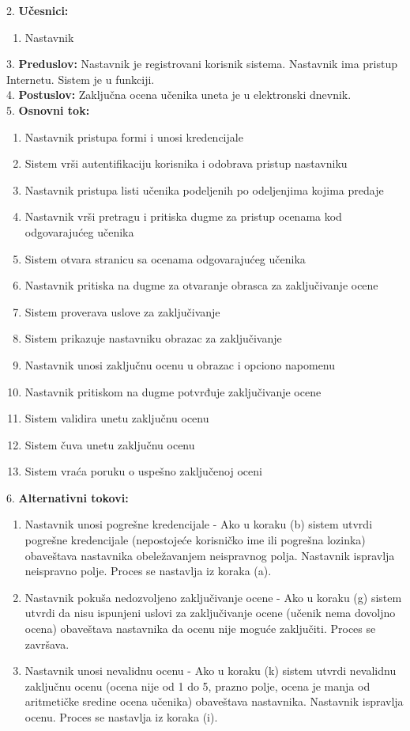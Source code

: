 \documentclass{article}
\begin{document}
2. \textbf{Učesnici:}
\begin{enumerate} [label=(\alph*)]
\item Nastavnik
\end{enumerate} 

3. \textbf{Preduslov:} Nastavnik je registrovani korisnik sistema. Nastavnik ima pristup Internetu. Sistem je u funkciji. \\

4. \textbf{Postuslov:} Zaključna ocena učenika uneta je u elektronski dnevnik. \\

5. \textbf{Osnovni tok:} 
\begin{enumerate} [label=(\alph*)]
\item Nastavnik pristupa formi i unosi kredencijale 
\item Sistem vrši autentifikaciju korisnika i odobrava pristup nastavniku
\item Nastavnik pristupa listi učenika podeljenih po odeljenjima kojima predaje
\item Nastavnik vrši pretragu i pritiska dugme za pristup ocenama kod odgovarajućeg učenika
\item Sistem otvara stranicu sa ocenama odgovarajućeg učenika
\item Nastavnik pritiska na dugme za otvaranje obrasca za zaključivanje ocene
\item Sistem proverava uslove za zaključivanje
\item Sistem prikazuje nastavniku obrazac za zaključivanje 
\item Nastavnik unosi zaključnu ocenu u obrazac i opciono napomenu
\item Nastavnik pritiskom na dugme potvrđuje zaključivanje ocene
\item Sistem validira unetu zaključnu ocenu
\item Sistem čuva unetu zaključnu ocenu
\item Sistem vraća poruku o uspešno zaključenoj oceni
\end{enumerate}


6. \textbf{Alternativni tokovi:}
\begin{enumerate} [label=(\roman*)]
\item Nastavnik unosi pogrešne kredencijale - Ako u koraku (b) sistem utvrdi pogrešne kredencijale (nepostojeće korisničko ime ili pogrešna lozinka) obaveštava nastavnika obeležavanjem neispravnog polja. Nastavnik ispravlja neispravno polje. Proces se nastavlja iz koraka (a).
\item Nastavnik pokuša nedozvoljeno zaključivanje ocene - Ako u koraku (g) sistem utvrdi da nisu ispunjeni uslovi za zaključivanje ocene (učenik nema dovoljno ocena) obaveštava nastavnika da ocenu nije moguće zaključiti. Proces se završava.
\item Nastavnik unosi nevalidnu ocenu - Ako u koraku (k) sistem utvrdi nevalidnu zaključnu ocenu (ocena nije od 1 do 5, prazno polje, ocena je manja od aritmetičke sredine ocena učenika) obaveštava nastavnika. Nastavnik ispravlja ocenu. Proces se nastavlja iz koraka (i).
\end{enumerate}
\end{document}
